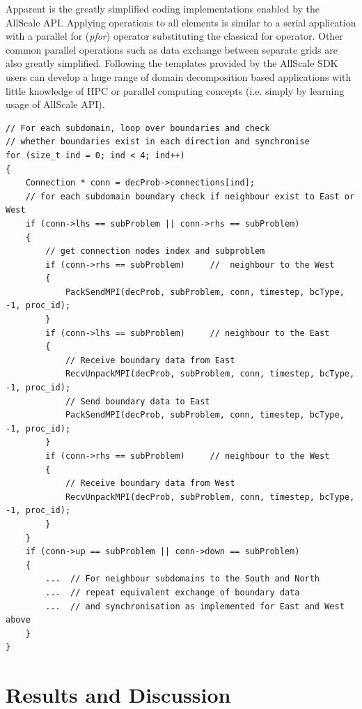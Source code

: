 \documentclass[conference,compsoc]{IEEEtran}
\begin{document}
Apparent is the greatly simplified coding implementations enabled by the AllScale API. Applying operations to all elements is similar to a serial application with a parallel for (\textit{pfor}) operator substituting the classical for operator. Other common parallel operations such as data exchange between separate grids are also greatly simplified. Following the templates provided by the AllScale SDK users can develop a huge range of domain decomposition based applications with little knowledge of HPC or parallel computing concepts (i.e. simply by learning usage of AllScale API). 

\begin{lstlisting}[caption= Sample MPI implementation of boundary exchange and synchronization within a DD problem
, label=boundMPI]
// For each subdomain, loop over boundaries and check
// whether boundaries exist in each direction and synchronise
for (size_t ind = 0; ind < 4; ind++)  
{   
    Connection * conn = decProb->connections[ind];  
    // for each subdomain boundary check if neighbour exist to East or West  
    if (conn->lhs == subProblem || conn->rhs == subProblem)  
    {
        // get connection nodes index and subproblem
        if (conn->rhs == subProblem)     //  neighbour to the West
        {
            PackSendMPI(decProb, subProblem, conn, timestep, bcType, -1, proc_id);
        }
        if (conn->lhs == subProblem)     // neighbour to the East 
        {
            // Receive boundary data from East 
            RecvUnpackMPI(decProb, subProblem, conn, timestep, bcType, -1, proc_id);
            // Send boundary data to East
            PackSendMPI(decProb, subProblem, conn, timestep, bcType, -1, proc_id);
        }
        if (conn->rhs == subProblem)     // neighbour to the West
        {
            // Receive boundary data from West 
            RecvUnpackMPI(decProb, subProblem, conn, timestep, bcType, -1, proc_id);
        }
    } 
    if (conn->up == subProblem || conn->down == subProblem)  
    {
        ...  // For neighbour subdomains to the South and North
        ...  // repeat equivalent exchange of boundary data 
        ...  // and synchronisation as implemented for East and West above
    }     
}
\end{lstlisting}







\section{Results and Discussion}
\end{document}
